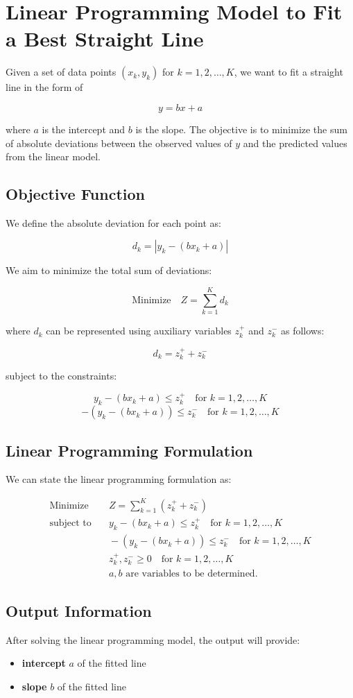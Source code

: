 \documentclass{article}
\begin{document}
\section*{Linear Programming Model to Fit a Best Straight Line}

Given a set of data points \( (x_k, y_k) \) for \( k = 1, 2, \ldots, K \), we want to fit a straight line in the form of 

\[
y = bx + a
\]

where \( a \) is the intercept and \( b \) is the slope. The objective is to minimize the sum of absolute deviations between the observed values of \( y \) and the predicted values from the linear model.

\subsection*{Objective Function}

We define the absolute deviation for each point as:

\[
d_k = |y_k - (bx_k + a)|
\]

We aim to minimize the total sum of deviations:

\[
\text{Minimize} \quad Z = \sum_{k=1}^{K} d_k
\]

where \( d_k \) can be represented using auxiliary variables \( z_k^+ \) and \( z_k^- \) as follows:

\[
d_k = z_k^+ + z_k^-
\]

subject to the constraints:

\[
y_k - (bx_k + a) \leq z_k^+ \quad \text{for } k = 1, 2, \ldots, K
\]
\[
-(y_k - (bx_k + a)) \leq z_k^- \quad \text{for } k = 1, 2, \ldots, K
\]

\subsection*{Linear Programming Formulation}

We can state the linear programming formulation as:

\begin{align*}
\text{Minimize} & \quad Z = \sum_{k=1}^{K} (z_k^+ + z_k^-) \\
\text{subject to} & \quad y_k - (bx_k + a) \leq z_k^+ \quad \text{for } k = 1, 2, \ldots, K \\
                   & \quad -(y_k - (bx_k + a)) \leq z_k^- \quad \text{for } k = 1, 2, \ldots, K \\
                   & \quad z_k^+, z_k^- \geq 0 \quad \text{for } k = 1, 2, \ldots, K \\
                   & \quad a, b \text{ are variables to be determined}.
\end{align*}

\subsection*{Output Information}

After solving the linear programming model, the output will provide:

\begin{itemize}
    \item \textbf{intercept} \( a \) of the fitted line
    \item \textbf{slope} \( b \) of the fitted line
\end{itemize}
\end{document}
